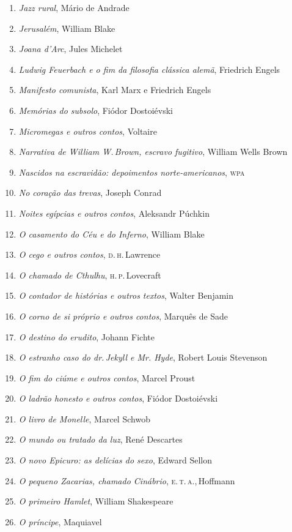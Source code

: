 \begin{enumerate}
\item \textit{Jazz rural}, Mário de Andrade
\item \textit{Jerusalém}, William Blake
\item \textit{Joana d'Arc}, Jules Michelet
\item \textit{Ludwig Feuerbach e o fim da filosofia clássica alemã}, Friedrich Engels
\item \textit{Manifesto comunista}, Karl Marx e Friedrich Engels
\item \textit{Memórias do subsolo}, Fiódor Dostoiévski
\item \textit{Micromegas e outros contos}, Voltaire
\item \textit{Narrativa de William W.\,Brown, escravo fugitivo}, William Wells Brown
\item \textit{Nascidos na escravidão: depoimentos norte-americanos}, \textsc{wpa}
\item \textit{No coração das trevas}, Joseph Conrad
\item \textit{Noites egípcias e outros contos}, Aleksandr Púchkin
\item \textit{O casamento do Céu e do Inferno}, William Blake
\item \textit{O cego e outros contos}, \textsc{d.\,h}.\,Lawrence
\item \textit{O chamado de Cthulhu}, \textsc{h.\,p.}\,Lovecraft
\item \textit{O contador de histórias e outros textos}, Walter Benjamin
\item \textit{O corno de si próprio e outros contos}, Marquês de Sade
\item \textit{O destino do erudito}, Johann Fichte
\item \textit{O estranho caso do dr.\,Jekyll e Mr. Hyde}, Robert Louis Stevenson
\item \textit{O fim do ciúme e outros contos}, Marcel Proust
\item \textit{O ladrão honesto e outros contos}, Fiódor Dostoiévski
\item \textit{O livro de Monelle}, Marcel Schwob
\item \textit{O mundo ou tratado da luz}, René Descartes
\item \textit{O novo Epicuro: as delícias do sexo}, Edward Sellon
\item \textit{O pequeno Zacarias, chamado Cinábrio}, \textsc{e.\,t.\,a.},\,Hoffmann
\item \textit{O primeiro Hamlet}, William Shakespeare
\item \textit{O príncipe}, Maquiavel

\end{enumerate}
